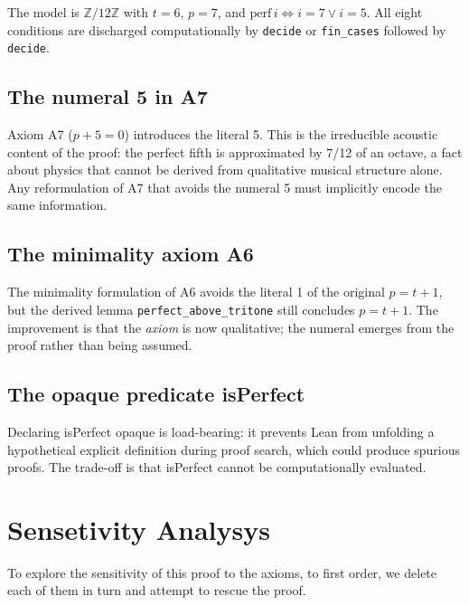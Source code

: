 \documentclass{amsart}
\begin{document}


The model is $\mathbb{Z}/12\mathbb{Z}$ with $t = 6$, $p = 7$, and
$\mathrm{perf}\,i \Leftrightarrow i = 7 \vee i = 5$.  All eight conditions
are discharged computationally by \texttt{decide} or \texttt{fin\_cases} followed
by \texttt{decide}.

\subsection*{The numeral 5 in A7}

Axiom A7 ($p + 5 = 0$) introduces the literal 5.  This is the irreducible
acoustic content of the proof: the perfect fifth is approximated by 7/12
of an octave, a fact about physics that cannot be derived from qualitative
musical structure alone.  Any reformulation of A7 that avoids the numeral
5 must implicitly encode the same information.

\subsection*{The minimality axiom A6}

The minimality formulation of A6 avoids the literal 1 of the original
$p = t + 1$, but the derived lemma \texttt{perfect\_above\_tritone}
still concludes $p = t + 1$.  The improvement is that the \emph{axiom}
is now qualitative; the numeral emerges from the proof rather than being
assumed.

\subsection*{The opaque predicate \textsf{isPerfect}}

Declaring \textsf{isPerfect} opaque is load-bearing: it prevents Lean from
unfolding a hypothetical explicit definition during proof search, which
could produce spurious proofs.  The trade-off is that \textsf{isPerfect}
cannot be computationally evaluated.

\section{Sensetivity Analysys}
\label{sec:sensetivity}
To explore the sensitivity of this proof to the axioms, to first order, we delete
each of them in turn and attempt to rescue the proof.
\end{document}
